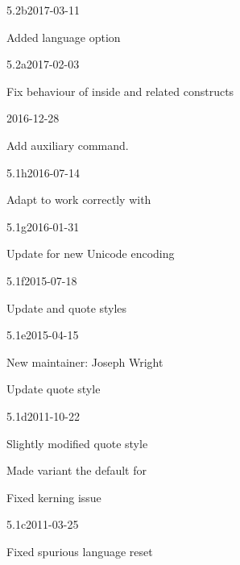 \documentclass{ltxdockit}[2010/09/26]
\begin{document}
\begin{changelog}

\begin{release}{5.2b}{2017-03-11}
\item Added language option 
\end{release}

\begin{release}{5.2a}{2017-02-03}
	\item Fix behaviour of  inside  and
	  related constructs
\end{release}

\begin{release}{5.2}{2016-12-28}
	\item Add  auxiliary command.
\end{release}

\begin{release}{5.1h}{2016-07-14}
\item Adapt  to work correctly with \luatex
\end{release}

\begin{release}{5.1g}{2016-01-31}
\item Update for new  Unicode encoding
\end{release}

\begin{release}{5.1f}{2015-07-18}
\item Update  and  quote styles
\end{release}

\begin{release}{5.1e}{2015-04-15}
\item New maintainer: Joseph Wright
\item Update  quote style
\end{release}

\begin{release}{5.1d}{2011-10-22}
\item Slightly modified quote style 
\item Made variant  the default for 
\item Fixed \xetex kerning issue
\end{release}

\begin{release}{5.1c}{2011-03-25}
\item Fixed spurious language reset
\end{release}


\end{changelog}
\end{document}
